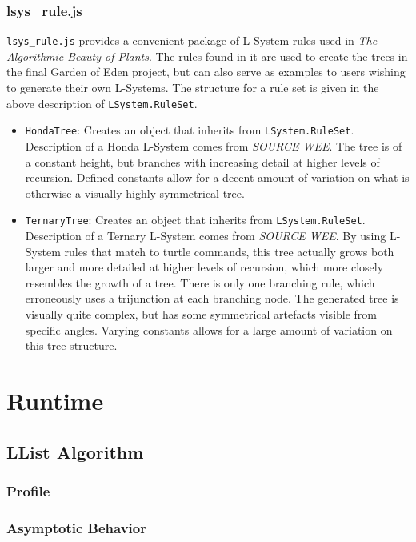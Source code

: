 \documentclass{article}
\newcommand{\tab}{\hspace*{2em}}
\begin{document}
            \subsubsection{lsys\_rule.js}
    \tab \verb|lsys_rule.js| provides a convenient package of L-System rules used in \emph{The
Algorithmic Beauty of Plants}. The rules found in it are used to create the trees in the final
Garden of Eden project, but can also serve as examples to users wishing to generate their own
L-Systems. The structure for a rule set is given in the above description of
\verb|LSystem.RuleSet|.
    \begin{itemize}
        \item \verb|HondaTree|: Creates an object that inherits from \verb|LSystem.RuleSet|.
Description of a Honda L-System comes from \emph{SOURCE WEE}. The tree is of a constant height, but
branches with increasing detail at higher levels of recursion. Defined constants allow for a
decent amount of variation on what is otherwise a visually highly symmetrical tree.

        \item \verb|TernaryTree|: Creates an object that inherits from \verb|LSystem.RuleSet|.
Description of a Ternary L-System comes from \emph{SOURCE WEE}. By using L-System rules that match
to turtle commands, this tree actually grows both larger and more detailed at higher levels of
recursion, which more closely resembles the growth of a tree. There is only one branching rule,
which erroneously uses a trijunction at each branching node. The generated tree is visually quite
complex, but has some symmetrical artefacts visible from specific angles. Varying constants allows
for a large amount of variation on this tree structure.

    \end{itemize}

    \section{Runtime} %
        \subsection{LList Algorithm}
            \subsubsection{Profile}
            \subsubsection{Asymptotic Behavior}
\end{document}
